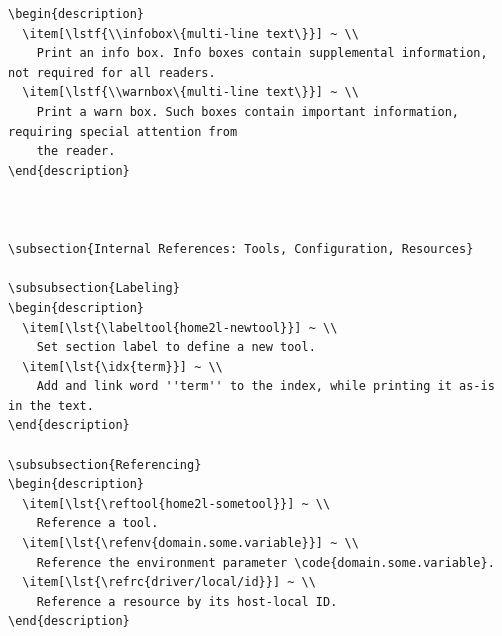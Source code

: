 \documentclass[12pt,english,parskip=half,headheight=19pt]{scrreprt}
\makeatletter
\renewenvironment{description}[1][8ex]
  {\list{}{\labelwidth=5ex \leftmargin=#1 \let\makelabel\descriptionlabel}}
  {\endlist}
\newcommand{\lst}[1]{\colorbox{lstbackground}{\footnotesize\code{#1}}}
\newcommand{\lstf}[1]{\colorbox{lstbackground}{\ttfamily\footnotesize#1}}
\newcommand{\infobox}[1]{
  \par
  \medskip
  \hfill
  \setlength\arrayrulewidth{1pt}
  \begin{tabular}[t]{c|c|}
    \parbox{1.8em}{\hfill\textit{\Huge\textbf{i}\,}}
    &
    \,\parbox{0.89\linewidth}{\setlength{\parskip}{0.5em} \small #1}\,
  \end{tabular}
  \medskip
  \par
}
\newcommand{\warnbox}[1]{
  \par
  \medskip
  \hfill
  \setlength\arrayrulewidth{1pt}
  \begin{tabular}[b]{c|c|}
    
    &
    \,\parbox{0.89\linewidth}{\setlength{\parskip}{0.5em}#1}\,
  \end{tabular}
  \medskip
  \par
}
\newcommand{\labeltool}[1]{\index{#1@\texttt{#1} (tool)} \label{tool:#1}}
\newcommand{\idx}[1]{#1\index{#1}}
\newcommand{\refenv}[1]{\hyperref[env:#1]{\texttt{#1}}}        %
\newcommand{\refrc}[1]{\hyperref[rc:#1]{\texttt{#1}}}
\newcommand{\reftool}[1]{\hyperref[tool:#1]{\texttt{\idx{#1}}}}
\makeatother
\begin{document}
\begin{description}
{\begin{lstlisting}[language=<language>]
\begin{description}
  \item[\lstf{\\infobox\{multi-line text\}}] ~ \\
    Print an info box. Info boxes contain supplemental information, not required for all readers.
  \item[\lstf{\\warnbox\{multi-line text\}}] ~ \\
    Print a warn box. Such boxes contain important information, requiring special attention from
    the reader.
\end{description}



\subsection{Internal References: Tools, Configuration, Resources}

\subsubsection{Labeling}
\begin{description}
  \item[\lst{\labeltool{home2l-newtool}}] ~ \\
    Set section label to define a new tool.
  \item[\lst{\idx{term}}] ~ \\
    Add and link word ''term'' to the index, while printing it as-is in the text.
\end{description}

\subsubsection{Referencing}
\begin{description}
  \item[\lst{\reftool{home2l-sometool}}] ~ \\
    Reference a tool.
  \item[\lst{\refenv{domain.some.variable}}] ~ \\
    Reference the environment parameter \code{domain.some.variable}.
  \item[\lst{\refrc{driver/local/id}}] ~ \\
    Reference a resource by its host-local ID.
\end{description}




\end{lstlisting}}
\end{description}
\end{document}
